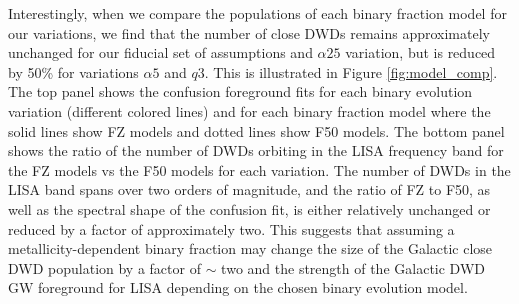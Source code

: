 \documentclass[twocolumn, linenumbers]{aastex631}
\begin{document}
Interestingly, when we compare the populations of each binary fraction 
model for our variations, we find that the number of close DWDs remains 
approximately unchanged for our fiducial set of assumptions and $\alpha25$ 
variation, but is reduced by 50\% for variations $\alpha5$ and $q3$. This 
is illustrated in Figure \ref{fig:model_comp}. The top panel shows the 
confusion foreground fits for each binary evolution variation (different 
colored lines) and for each binary fraction model where the solid lines 
show FZ models and dotted lines show F50 models. The bottom panel shows 
the ratio of the number of DWDs orbiting in the LISA frequency band for 
the FZ models vs the F50 models for each variation. The number of DWDs in 
the LISA band spans over two orders of magnitude, and the ratio of FZ to 
F50, as well as the spectral shape of the confusion fit, is either 
relatively unchanged or reduced by a factor of approximately two. This 
suggests that assuming a metallicity-dependent binary fraction may change 
the size of the Galactic close DWD population by a factor of $\sim$ two 
and the strength of the Galactic DWD GW foreground for LISA depending on 
the chosen binary evolution model.
\end{document}
